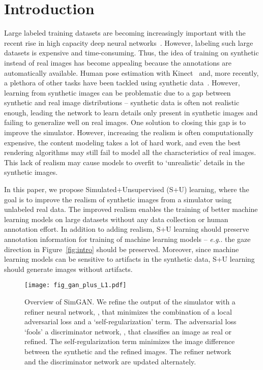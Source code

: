 \documentclass[10pt,twocolumn,letterpaper]{article}
\makeatletter
\DeclareRobustCommand\onedot{\futurelet\@let@token\@onedot}
\def\@onedot{\ifx\@let@token.\else.\null\fi\xspace}
\def\eg{\emph{e.g}\onedot} \def\Eg{\emph{E.g}\onedot}
\makeatother
\begin{document}
\section{Introduction}

Large labeled training datasets are becoming increasingly important with the recent rise in high capacity deep neural networks~\cite{imagenet_cvpr09, mscoco, ZhangLL16, ZhangLL16, youtub8M_16, Nagaraja2016, openimages}.
However, labeling such large datasets is expensive and time-consuming.
Thus, the idea of training on synthetic instead of real images has become appealing because the annotations are automatically available. 
Human pose estimation with Kinect~\cite{Shotton13} and, more recently, a plethora of other tasks have been tackled using synthetic data~\cite{Wood16,Wang15,qiu2016unrealcv,Shafaei16}.
However, learning from synthetic images can be problematic due to a gap between synthetic and real image distributions -- synthetic data is often not realistic enough, leading the network to learn details only present in synthetic images and failing to generalize well on real images.
One solution to closing this gap is to improve the simulator.
However, increasing the realism is often computationally expensive, the content modeling takes a lot of hard work, and even the best rendering algorithms may still fail to model all the characteristics of real images. 
This lack of realism may cause models to overfit to `unrealistic' details in the synthetic images.

In this paper, we propose Simulated+Unsupervised (S+U) learning, where the goal is to improve the realism of synthetic images from a simulator using unlabeled real data.
The improved realism enables the training of better machine learning models on large datasets without any data collection or human annotation effort. 
In addition to adding realism, S+U learning should preserve annotation information for training of machine learning models -- \eg the gaze direction in Figure~\ref{fig:intro} should be preserved.
Moreover, since machine learning models can be sensitive to artifacts in the synthetic data, S+U learning should generate images without artifacts.

\begin{figure}
\centering
\texttt{[image: fig\_gan\_plus\_L1.pdf]}
\caption{Overview of SimGAN. 
We refine the output of the simulator with a refiner neural network, , that minimizes the combination of a local adversarial loss and a `self-regularization' term. 
The adversarial loss `fools' a discriminator network, , that classifies an image as real or refined. 
The self-regularization term minimizes the image difference between the synthetic and the refined images. 
The refiner network and the discriminator network are updated alternately.}
\label{fig:method_overview}
\end{figure}
\end{document}
